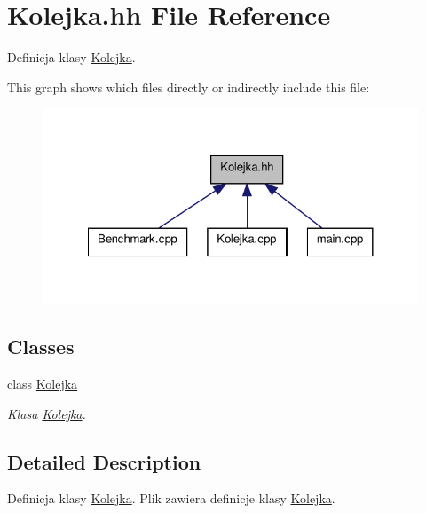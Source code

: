\hypertarget{a00008}{\section{Kolejka.\-hh File Reference}
\label{a00008}
}


Definicja klasy \hyperlink{a00002}{Kolejka}.  


This graph shows which files directly or indirectly include this file\-:\nopagebreak
\begin{figure}[H]
\begin{center}
\leavevmode
\includegraphics[width=324pt]{a00019}
\end{center}
\end{figure}
\subsection*{Classes}
\begin{DoxyCompactItemize}
\item 
class \hyperlink{a00002}{Kolejka}
\begin{DoxyCompactList}\small\item\em Klasa \hyperlink{a00002}{Kolejka}. \end{DoxyCompactList}\end{DoxyCompactItemize}


\subsection{Detailed Description}
Definicja klasy \hyperlink{a00002}{Kolejka}. Plik zawiera definicje klasy \hyperlink{a00002}{Kolejka}. 